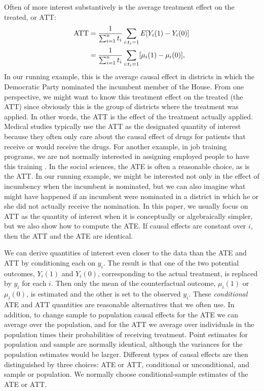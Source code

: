 \documentclass[11pt,titlepage]{article}
\begin{document}
Often of more interest substantively is the average treatment effect
on the treated, or ATT:
\begin{align}
  \label{att}
  \text{ATT} & = \frac{1}{\sum_{i=1}^n t_i}\sum_{i:t_i=1} E[Y_i(1) -
  Y_i(0)]\notag\\ 
  & = \frac{1}{\sum_{i=1}^n t_i}\sum_{i:t_i=1}[\mu_i(1) - \mu_i(0)],
\end{align}
In our running example, this is the average causal effect in districts
in which the Democratic Party nominated the incumbent member of the
House.  From one perspective, we might want to know this treatment
effect on the treated (the ATT) since obviously this is the group of
districts where the treatment was applied.  In other words, the ATT is
the effect of the treatment actually applied.  Medical studies
typically use the ATT as the designated quantity of interest because
they often only care about the causal effect of drugs for patients
that receive or would receive the drugs.  For another example, in job
training programs, we are not normally interested in assigning
employed people to have this training \citep{HecIchTod98}.  In the
social sciences, the ATE is often a reasonable choice, as is the ATT.
In our running example, we might be interested not only in the effect
of incumbency when the incumbent is nominated, but we can also imagine
what might have happened if an incumbent were nominated in a district
in which he or she did not actually receive the nomination.  In this
paper, we usually focus on ATT as the quantity of interest when it is
conceptually or algebraically simpler, but we also show how to compute
the ATE.  If causal effects are constant over $i$, then the ATT and
the ATE are identical.

We can derive quantities of interest even closer to the data than the
ATE and ATT by conditioning each on $y_i$.  The result is that one of
the two potential outcomes, $Y_i(1)$ and $Y_i(0)$, corresponding to
the actual treatment, is replaced by $y_i$ for each $i$.  Then only
the mean of the counterfactual outcome, $\mu_i(1)$ or $\mu_i(0)$, is
estimated and the other is set to the observed $y_i$.  These
\emph{conditional} ATE and ATT quantities are reasonable alternatives
that we often use.  In addition, to change sample to population causal
effects for the ATE we can average over the population, and for the
ATT we average over individuals in the population times their
probabilities of receiving treatment.  Point estimates for population
and sample are normally identical, although the variances for the
population estimates would be larger.  Different types of causal
effects are then distinguished by three choices: ATE or ATT,
conditional or unconditional, and sample or population.  We normally
choose conditional-sample estimates of the ATE or ATT.
\end{document}
